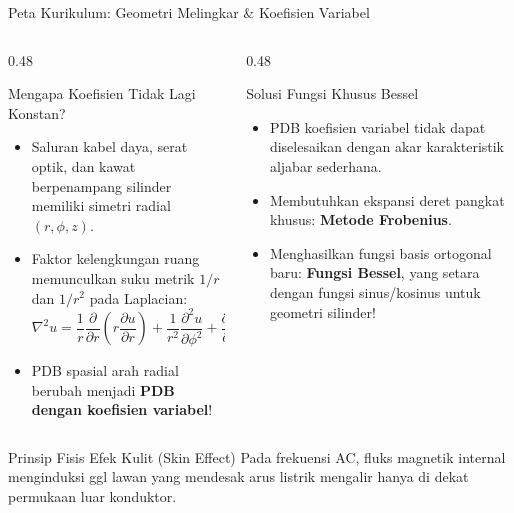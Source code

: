 \documentclass[aspectratio=169,10pt]{beamer}
\begin{document}
\begin{frame}{Peta Kurikulum: Geometri Melingkar \& Koefisien Variabel}
  \begin{columns}[t]
    \begin{column}{0.48\textwidth}
      \begin{block}{Mengapa Koefisien Tidak Lagi Konstan?}
        \small
        \begin{itemize}
          \item Saluran kabel daya, serat optik, dan kawat berpenampang silinder memiliki simetri radial $(r, \phi, z)$.
          \item Faktor kelengkungan ruang memunculkan suku metrik $1/r$ dan $1/r^2$ pada Laplacian:
          \begin{equation*}
            \nabla^2 u = \frac{1}{r}\frac{\partial}{\partial r}\left(r\frac{\partial u}{\partial r}\right) + \frac{1}{r^2}\frac{\partial^2 u}{\partial \phi^2} + \frac{\partial^2 u}{\partial z^2}
          \end{equation*}
          \item PDB spasial arah radial berubah menjadi \textbf{PDB dengan koefisien variabel}!
        \end{itemize}
      \end{block}
    \end{column}
    \begin{column}{0.48\textwidth}
      \begin{alertblock}{Solusi Fungsi Khusus Bessel}
        \small
        \begin{itemize}
          \item PDB koefisien variabel tidak dapat diselesaikan dengan akar karakteristik aljabar sederhana.
          \item Membutuhkan ekspansi deret pangkat khusus: \textbf{Metode Frobenius}.
          \item Menghasilkan fungsi basis ortogonal baru: \textbf{Fungsi Bessel}, yang setara dengan fungsi sinus/kosinus untuk geometri silinder!
        \end{itemize}
      \end{alertblock}
    \end{column}
  \end{columns}
  \vspace{-0.05cm}
  \begin{exampleblock}{Prinsip Fisis Efek Kulit (Skin Effect)}
    \footnotesize
    Pada frekuensi AC, fluks magnetik internal menginduksi ggl lawan yang mendesak arus listrik mengalir hanya di dekat permukaan luar konduktor.
  \end{exampleblock}
\end{frame}
\end{document}
